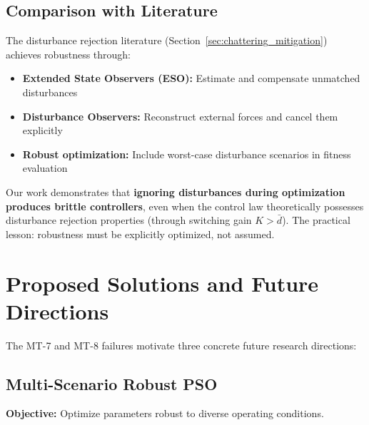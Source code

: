 \subsection{Comparison with Literature}
\label{subsec:disturbance_literature}

The disturbance rejection literature (Section~\ref{sec:chattering_mitigation}) achieves robustness through:
\begin{itemize}
    \item \textbf{Extended State Observers (ESO):} Estimate and compensate unmatched disturbances~\cite{chen2016disturbance}
    \item \textbf{Disturbance Observers:} Reconstruct external forces and cancel them explicitly
    \item \textbf{Robust optimization:} Include worst-case disturbance scenarios in fitness evaluation
\end{itemize}

Our work demonstrates that \textbf{ignoring disturbances during optimization produces brittle controllers}, even when the control law theoretically possesses disturbance rejection properties (through switching gain $K > \bar{d}$). The practical lesson: robustness must be explicitly optimized, not assumed.

\section{Proposed Solutions and Future Directions}
\label{sec:proposed_solutions}

The MT-7 and MT-8 failures motivate three concrete future research directions:

\subsection{Multi-Scenario Robust PSO}
\label{subsec:multi_scenario_pso}

\textbf{Objective:} Optimize parameters robust to diverse operating conditions.

